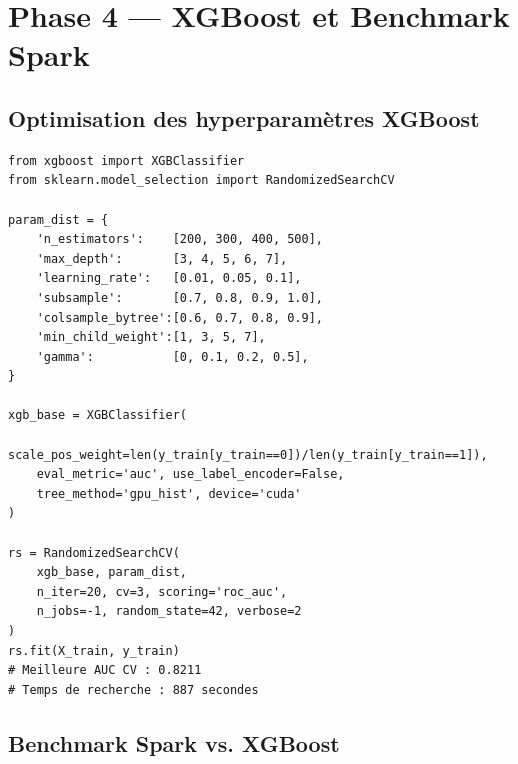 \section{Phase 4 --- XGBoost et Benchmark Spark}

\subsection{Optimisation des hyperparamètres XGBoost}

\begin{lstlisting}[caption=RandomizedSearchCV pour XGBoost, label=lst:xgb_search]
from xgboost import XGBClassifier
from sklearn.model_selection import RandomizedSearchCV

param_dist = {
    'n_estimators':    [200, 300, 400, 500],
    'max_depth':       [3, 4, 5, 6, 7],
    'learning_rate':   [0.01, 0.05, 0.1],
    'subsample':       [0.7, 0.8, 0.9, 1.0],
    'colsample_bytree':[0.6, 0.7, 0.8, 0.9],
    'min_child_weight':[1, 3, 5, 7],
    'gamma':           [0, 0.1, 0.2, 0.5],
}

xgb_base = XGBClassifier(
    scale_pos_weight=len(y_train[y_train==0])/len(y_train[y_train==1]),
    eval_metric='auc', use_label_encoder=False,
    tree_method='gpu_hist', device='cuda'
)

rs = RandomizedSearchCV(
    xgb_base, param_dist,
    n_iter=20, cv=3, scoring='roc_auc',
    n_jobs=-1, random_state=42, verbose=2
)
rs.fit(X_train, y_train)
# Meilleure AUC CV : 0.8211
# Temps de recherche : 887 secondes
\end{lstlisting}

\subsection{Benchmark Spark vs. XGBoost}


